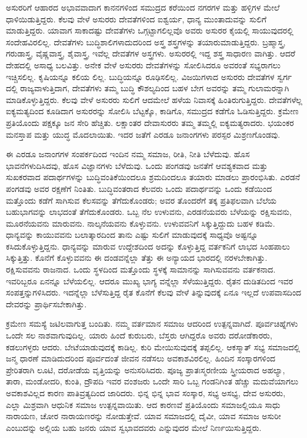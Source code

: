 ಅಸುರರಿಗೆ ಆಹಾರದ ಅಭಾವವಾದಾಗ ಕಾನನಗಳಿಂದ ಸಮುದ್ರದ ಕರೆಯಿಂದ ನಗರಗಳ ಮತ್ತು ಹಳ್ಳಿಗಳ ಮೇಲೆ ಧಾಳಿಯಿಡುತ್ತಿದ್ದರು. ಕೆಲವು ವೇಳೆ ಅಸುರರು ದೇವತೆಗಳಿಂದ ಐಶ್ವರ್ಯ, ಧಾನ್ಯ ಮುಂತಾದುವನ್ನು ಸುಲಿಗೆ ಮಾಡುತ್ತಿದ್ದರು. ಯಾವಾಗ ಸಾಕಾದಷ್ಟು ದೇವತೆಗಳು ಒಗ್ಗಟ್ಟಾಗಲಿಲ್ಲವೊ ಅವರು ಅಸುರರ ಕೈಯಲ್ಲಿ ಸಾಯುವುದರಲ್ಲಿ ಸಂದೇಹವಿರಲಿಲ್ಲ. ದೇವತೆಗಳು ಬುದ್ಧಿಶಾಲಿಗಳಾದುದರಿಂದ ಅಸ್ತ್ರ ಶಸ್ತ್ರಗಳನ್ನು ತಯಾರುಮಾಡುತ್ತಿದ್ದರು. ಬ್ರಹ್ಮಾಸ್ತ್ರ, ಗರುಡಾಸ್ತ್ರ, ವೈಷ್ಣವಾಸ್ತ್ರ, ಶೈವಾಸ್ತ್ರ, ಇವೆಲ್ಲ ದೇವತೆಗಳ ಅಸ್ತ್ರಗಳು. ಅಸುರರಲ್ಲಿ ಇದ್ದ ಶಸ್ತ್ರ ಸಾಧಾರಣ ವಾಗಿತ್ತು. ಆದರೆ ದೇಹದಲ್ಲಿ ಅಸಾಧ್ಯ ಬಲವಿತ್ತು. ಅನೇಕ ವೇಳೆ ಅಸುರರು ದೇವತೆಗಳನ್ನು ಸೋಲಿಸಿದರೂ ಅವರಂತೆ ಸಭ್ಯರಾಗಲು ಇಚ್ಚಿಸಲಿಲ್ಲ. ಕೃಷಿಯನ್ನೂ ಕಲಿಯ ಲಿಲ್ಲ. ಬುದ್ಧಿಯನ್ನೂ ರೂಢಿಸಲಿಲ್ಲ. ವಿಜಯಿಗಳಾದ ಅಸುರರು ದೇವತೆಗಳ ಸ್ವರ್ಗ ದಲ್ಲಿ ರಾಜ್ಯವಾಳುತ್ತಿದಾಗ, ದೇವತೆಗಳು ತಮ್ಮ ಬುದ್ಧಿ ಕೌಶಲ್ಯದಿಂದ ಬಹಳ ಬೇಗ ಅವರನ್ನು ತಮ್ಮ ಗುಲಾಮರನ್ನಾಗಿ ಮಾಡಿಕೊಳ್ಳುತ್ತಿದ್ದರು. ಕೆಲವು ವೇಳೆ ಅಸುರರು ಸುಲಿಗೆ ಆದಮೇಲೆ ಹಳೆಯ ನಿವಾಸಕ್ಕೆ ಹಿಂತಿರುಗುತ್ತಿದ್ದರು. ದೇವತೆಗಳೆಲ್ಲ ಐಕ್ಯಮತ್ಯದಿಂದ ಕೂಡಿದಾಗ ಅಸುರರನ್ನು ಸೋಲಿಸಿ ಬೆಟ್ಟಕ್ಕೊ, ಕಾಡಿಗೊ, ಸಮುದ್ರದ ಕಡೆಗೊ ಓಡಿಸುತ್ತಿದ್ದರು. ಕ್ರಮೇಣ ಪ್ರತಿಯೊಂದು ಪಕ್ಷಕ್ಕೂ ಜನ ಸೇರಿ ಹೆಚ್ಚಿತು. ಲಕ್ಷಾಂತರ ದೇವಾಸುರರು ತಮ್ಮ ತಮ್ಮಲ್ಲಿ ಐಕ್ಯಮತ್ಯರಾದರು. ಭಯಂಕರ ಮನಸ್ತಾಪ ಮತ್ತು ಯುದ್ಧ ಮೊದಲಾಯಿತು. ಇದರ ಜತೆಗೆ ಎರಡೂ ಜನಾಂಗಗಳು ಪರಸ್ಪರ ಮಿಶ್ರಣಗೊಂಡವು.

ಈ ಎರಡೂ ಜನಾಂಗಗಳ ಸಂಪರ್ಕದಿಂದ ಇಂದಿನ ನಮ್ಮ ಸಮಾಜ, ರೀತಿ, ನೀತಿ ಬೆಳೆದುವು. ಹೊಸ ಭಾವನೆಗಳುದಿಸಿದವು, ಹೊಸ ವಿಜ್ಞಾನಗಳು ಬೆಳೆದುವು. ಒಂದು ಪಂಗಡವು ಜನತೆಗೆ ಆವಶ್ಯಕವಾದ ಮತ್ತು ಸುಖಕರವಾದ ಪದಾರ್ಥಗಳನ್ನು ಬುದ್ಧಿವಂತಿಕೆಯಿಂದಲೂ ಶ್ರಮದಿಂದಲೂ ತಯಾರು ಮಾಡಲು ಪ್ರಾರಂಭಿಸಿತು. ಎರಡನೆ ಪಂಗಡವು ಅವರ ರಕ್ಷಣೆಗೆ ನಿಂತಿತು. ಬುದ್ಧಿವಂತರಾದ ಕೆಲವರು ಒಂದು ಪದಾರ್ಥವನ್ನು ಒಂದು ಕಡೆಯಿಂದ ಮತ್ತೊಂದು ಕಡೆಗೆ ಸಾಗಿಸುವ ಕೆಲಸವನ್ನು ತೆಗೆದುಕೊಂಡರು; ಅವರ ತೊಂದರೆಗೆ ತಕ್ಕ ಪ್ರತಿಫಲವಾಗಿ ಬೆಲೆಯ ಬಹುಭಾಗವನ್ನು ಲಾಭದಂತೆ ತೆಗೆದುಕೊಂಡರು. ಒಬ್ಬ ನೆಲ ಉಳುವನು, ಎರಡನೆಯವರು ಬೆಳೆಯನ್ನು ರಕ್ಷಿಸುವನು, ಮೂರನೆಯವನು ಮಾರುವನು. ನಾಲ್ಕನೆಯವನು ಕೊಳ್ಳುವನು. ಉಳುವವನಿಗೆ ಸಿಕ್ಕುತ್ತಿದ್ದುದು ಬಹಳ ಕಡಿಮೆ. ಧಾನ್ಯವನ್ನು ಕಾಯುವವನು ಬಲಾತ್ಕಾರದಿಂದ ತಾನು ಎಷ್ಟು ಸುಲಿಗೆ ಮಾಡುವುದಕ್ಕೆ ಸಾಧ್ಯವೊ ಅಷ್ಟನ್ನೂ ಕಸಿದುಕೊಳ್ಳುತ್ತಿದ್ದನು. ಧಾನ್ಯವನ್ನು ಮಾರುವ ಉದ್ದೇಶದಿಂದ ಅದನ್ನು ಕೊಳ್ಳುತ್ತಿದ್ದ ವರ್ತಕನಿಗೆ ಲಾಭದ ಸಿಂಹಪಾಲು ಸಿಕ್ಕುತ್ತಿತ್ತು. ಕೊನೆಗೆ ಕೊಳ್ಳುವವನು ಈ ದಂಡವನ್ನೆಲ್ಲಾ ತೆತ್ತು ಈ ಅನ್ಯಾಯದ ಭಾರದಲ್ಲಿ ನರಳಬೇಕಾಗಿತ್ತು. ರಕ್ಷಿಸುವವನು ರಾಜನಾದ. ಒಂದು ಸ್ಥಳದಿಂದ ಮತ್ತೊಂದು ಸ್ಥಳಕ್ಕೆ ಸಾಮಾನನ್ನು ಸಾಗಿಸುವವನು ವರ್ತಕನಾದ. ಇವರಿಬ್ಬರೂ ಏನನ್ನೂ ಬೆಳೆಯಲಿಲ್ಲ. ಆದರೂ ಮುಖ್ಯ ಭಾಗ್ಯ ವನ್ನೆಲ್ಲಾ ಸೆಳೆಯುತ್ತಿದ್ದರು. ರೈತನ ದುಡಿತದಿಂದ ಇವರ ಸಂಪತ್ತನ್ನುಗಳಿಸಿದರು. ಇದನ್ನೆಲ್ಲಾ ಬೆಳೆಸುತ್ತಿದ್ದ ರೈತ ಕೊನೆಗೆ ಕೆಲವು ವೇಳೆ ತಿನ್ನುವುದಕ್ಕೆ ಏನೂ ಇಲ್ಲದೆ ಉಪವಾಸದಿಂದ ದೇವರನ್ನು ಪ್ರಾರ್ಥಿಸಬೇಕಾಗಿತ್ತು.

ಕ್ರಮೇಣ ಸಮಸ್ಯೆ ಜಟಿಲವಾಗುತ್ತ ಬಂದಿತು. ನಮ್ಮ ವರ್ತಮಾನ ಸಮಾಜ ಆದರಿಂದ ಉತ್ಪನ್ನವಾಗಿದೆ. ಪೂರ್ವಚಿಹ್ನೆಗಳು ಒಂದೇ ಸಲ ನಾಶವಾಗುವುದಿಲ್ಲ. ಯಾರು ಹಿಂದೆ ಕುರುಬರು, ಬೆಸ್ತರು ಆಗಿದ್ದರೊ ಅವರು ದರೋಡೆಕಾರರು, ಕಡಲುಗಳ್ಳರು ಆದರು. ಬೇಟೆಯಾಡುವುದಕ್ಕೆ ಕಾಡಿಲ್ಲ. ಕುರಿ ಮೇಯಿಸುವುದಕ್ಕೆ ತಪ್ಪಲಿಲ್ಲ. ಆಕಸ್ಮಾತ್​ ಸಭ್ಯ ಸಮಾಜದಲ್ಲಿ ಜನ್ಮ ಧಾರಣೆ ಮಾಡಿದುದರಿಂದ ಪೂರ್ವದಂತೆ ಜೀವನ ನಡೆಸಲು ಅವಕಾಶವಿರಲಿಲ್ಲ. ಹಿಂದಿನ ಸಂಸ್ಕಾರಗಳಿಂದ ಪ್ರೇರಿತರಾಗಿ ಲೂಟಿ, ದರೋಡೆಯ ವೃತ್ತಿಯನ್ನು ಅನುಸರಿಸಿದರು. ಪೂಜ್ಯ ಪ್ರಾತಃಸ್ಮರಣೀಯ ಸ್ತ್ರೀಯರಾದ ಅಹಲ್ಯಾ, ತಾರಾ, ಮಂಡೋದರಿ, ಕುಂತಿ, ದ್ರೌಪದಿ ಇವರ ವಂಶಜರು ಒಂದೇ ಸಾರಿ ಒಬ್ಬ ಗಂಡನಿಗಿಂತ ಹೆಚ್ಚು ಮದುವೆಯಾಗಲು ಅವಕಾಶವಿಲ್ಲದ ಕಾರಣ ಪಾತಿವ್ರತ್ಯದಿಂದ ಜಾರಿದರು. ಭಿನ್ನ ಭಿನ್ನ ಭಾವ ಸಂಸ್ಕಾರ, ಸಭ್ಯ ಅಸಭ್ಯ, ದೇವ ಅಸುರರು, ಎಲ್ಲಾ ಮಿಶ್ರವಾಗಿ ಆಧುನಿಕ ಸಮಾಜ ಉತ್ಪನ್ನವಾಯಿತು. ಆದ ಕಾರಣವೆ ಪ್ರತಿಯೊಂದು ಸಮಾಜಲ್ಲಿಯೂ ಸಾಧು ನಾರಾಯಣ, ಚೋರ ನಾರಾಯಣರನ್ನು ನೋಡುತ್ತೇವೆ. ಯಾವ ಸಮಾಜದಲ್ಲಿ ದೈವೀ, ಯಾವ ಸಮಾಜ ಅಸುರೀ ಎಂಬುದನ್ನು ಅಲ್ಲಿಯ ಬಹು ಜನರು ಯಾವ ಸ್ವಭಾವದವರು ಎನ್ನುವುದರ ಮೇಲೆ ನಿರ್ಣಯಿಸುತ್ತಿದ್ದರು.

